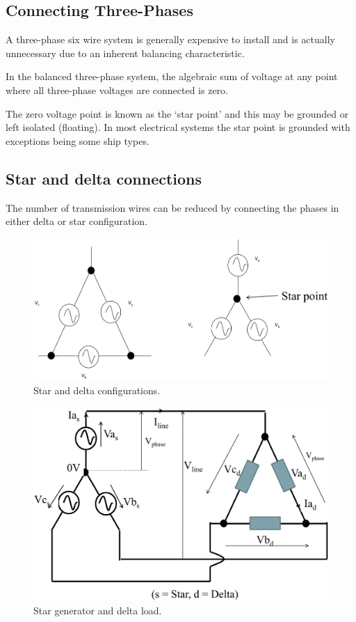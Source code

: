 \documentclass[class=report, crop=false, 12pt,a4paper]{standalone}
\begin{document}
\subsection{Connecting Three-Phases}
A three-phase six wire system is generally expensive to install and is actually unnecessary due to an inherent balancing characteristic.

In the balanced three-phase system, the algebraic sum of voltage at any point where all three-phase voltages are connected is zero.

The zero voltage point is known as the `star point' and this may be grounded or left isolated (floating). In most electrical systems the star point is grounded with exceptions being some ship types.
\subsection{Star and delta connections}
The number of transmission wires can be reduced by connecting the phases in either delta or star configuration.
\begin{figure}[H]
	\centering
	\includegraphics[width = \textwidth]{../img/figure7.png}
	\caption{Star and delta configurations.}
\end{figure}
\begin{figure}[H]
	\centering
	\includegraphics[width = \textwidth]{../img/figure8.png}
	\caption{Star generator and delta load.}
\end{figure}
\end{document}
